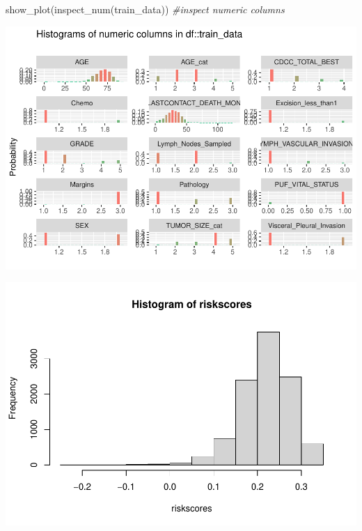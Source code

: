 \documentclass[
  11pt,
]{article}
\newenvironment{Shaded}{\begin{snugshade}}{\end{snugshade}}
\newcommand{\CommentTok}[1]{\textcolor[rgb]{0.56,0.35,0.01}{\textit{#1}}}
\newcommand{\FunctionTok}[1]{\textcolor[rgb]{0.00,0.00,0.00}{#1}}
\newcommand{\NormalTok}[1]{#1}
\newcommand{\OtherTok}[1]{\textcolor[rgb]{0.56,0.35,0.01}{#1}}
\newcommand{\SpecialCharTok}[1]{\textcolor[rgb]{0.00,0.00,0.00}{#1}}
\begin{document}
\begin{Shaded}
\begin{Highlighting}[]
\FunctionTok{show\_plot}\NormalTok{(}\FunctionTok{inspect\_num}\NormalTok{(train\_data)) }\CommentTok{\#inspect numeric columns }
\end{Highlighting}
\end{Shaded}

\includegraphics{Hazard_and_Risk_plot_updated_files/figure-latex/unnamed-chunk-10-3.pdf}

\begin{Shaded}
\end{Shaded}

\includegraphics{Hazard_and_Risk_plot_updated_files/figure-latex/unnamed-chunk-11-1.pdf}
\end{document}
